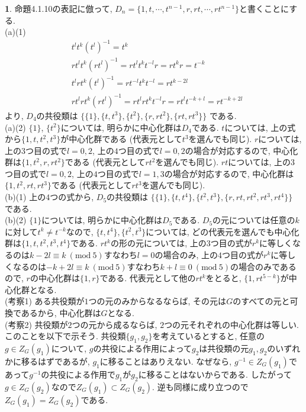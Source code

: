 \documentclass{article}
\theoremstyle{definition}
\newtheorem{ans}{}
\numberwithin{ans}{subsection}
\begin{document}
\begin{ans}
  命題4.1.10の表記に倣って, $D_n = \{1, t, \cdots , t^{n-1}, r, rt, \cdots , rt^{n-1}\}$と書くことにする.\\
  (a)(1)
  \begin{align*}
    &t^lt^k(t^l)^{-1} = t^k\\
    &rt^lt^k(rt^l)^{-1} = rt^lt^kt^{-l}r = rt^kr = t^{-k}\\
    &t^lrt^k(t^l)^{-1} = rt^{-l}t^kt^{-l} = rt^{k-2l}\\
    &rt^lrt^k(rt^l)^{-1} = rt^lrt^kt^{-l}r = rt^lt^{-k+l} = rt^{-k+2l}
  \end{align*}
  より, $D_4$の共役類は
  $\{
    \{1\},
    \{t, t^3\},
    \{t^2\},
    \{r, rt^2\},
    \{rt, rt^3\}
  \}$
  である.\\
  (a)(2) $\{1\}$, $\{t^2\}$については, 明らかに中心化群は$D_4$である.
  $t$については, 上の式から$\{1, t, t^2, t^3\}$が中心化群である (代表元として$t^3$を選んでも同じ).
  $r$については, 上の$3$つ目の式で$l = 0, 2$, 上の$4$つ目の式で$l = 0, 2$の場合が対応するので,
  中心化群は$\{1, t^2, r, rt^2\}$である (代表元として$rt^2$を選んでも同じ).
  $rt$については, 上の$3$つ目の式で$l = 0, 2$, 上の$4$つ目の式で$l = 1, 3$の場合が対応するので,
  中心化群は$\{1, t^2, rt, rt^3\}$である (代表元として$rt^3$を選んでも同じ).\\
  (b)(1)
  上の$4$つの式から, $D_5$の共役類は
  $\{
    \{1\},
    \{t, t^4\},
    \{t^2, t^3\},
    \{r, rt, rt^2, rt^3, rt^4\}
  \}$
  である.\\
  (b)(2) $\{1\}$については, 明らかに中心化群は$D_5$である.
  $D_5$の元については任意の$k$に対して$t^k \neq t^{-k}$なので,
  $\{t, t^4\}, \{t^2, t^3\}$については,
  どの代表元を選んでも中心化群は$\{1, t, t^2, t^3, t^4\}$である.
  $rt^k$の形の元については, 上の$3$つ目の式が$r^k$に等しくなるのは$k - 2l \equiv k\ (\mathrm{mod}\ 5)$すなわち$l = 0$の場合のみ,
  上の$4$つ目の式が$r^k$に等しくなるのは$-k + 2l \equiv k\ (\mathrm{mod}\ 5)$すなわち$k + l \equiv 0\ (\mathrm{mod}\ 5)$の場合のみであるので,
  $r$の中心化群は$\{1, r\}$である. 代表元として他の$rt^k$をとると, $\{1, rt^{5-k}\}$が中心化群となる.\\
  (考察1) ある共役類が$1$つの元のみからなるならば, その元は$G$のすべての元と可換であるから, 中心化群は$G$となる.\\
  (考察2) 共役類が$2$つの元から成るならば, $2$つの元それぞれの中心化群は等しい.
  このことを以下で示そう.
  共役類$\{g_1, g_2\}$を考えているとすると,
  任意の$g \in Z_G(g_1)$について, $g$の共役による作用によって$g_2$は共役類の元$g_1, g_2$のいずれかに移るはずであるが, $g_1$に移ることはありえない.
  なぜなら, $g^{-1} \in Z_G(g_1)$であって$g^{-1}$の共役による作用で$g_1$が$g_2$に移ることはないからである.
  したがって$g \in Z_G(g_2)$なので$Z_G(g_1) \subset Z_G(g_2)$. 逆も同様に成り立つので$Z_G(g_1) = Z_G(g_2)$である.
\end{ans}
\end{document}
